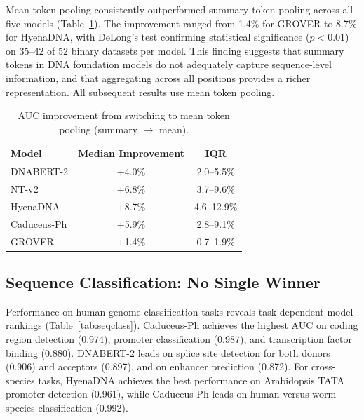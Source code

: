 \documentclass[11pt]{article}
\begin{document}
Mean token pooling consistently outperformed summary token pooling across all five models (Table~\ref{tab:pooling}). The improvement ranged from 1.4\% for GROVER to 8.7\% for HyenaDNA, with DeLong's test confirming statistical significance ($p < 0.01$) on 35--42 of 52 binary datasets per model. This finding suggests that summary tokens in DNA foundation models do not adequately capture sequence-level information, and that aggregating across all positions provides a richer representation. All subsequent results use mean token pooling.

\begin{table}[h]
\centering
\caption{AUC improvement from switching to mean token pooling (summary $\rightarrow$ mean).}
\label{tab:pooling}
\begin{tabular}{lcc}
\toprule
Model & Median Improvement & IQR \\
\midrule
DNABERT-2 & +4.0\% & 2.0--5.5\% \\
NT-v2 & +6.8\% & 3.7--9.6\% \\
HyenaDNA & +8.7\% & 4.6--12.9\% \\
Caduceus-Ph & +5.9\% & 2.8--9.1\% \\
GROVER & +1.4\% & 0.7--1.9\% \\
\bottomrule
\end{tabular}
\end{table}

\subsection{Sequence Classification: No Single Winner}

Performance on human genome classification tasks reveals task-dependent model rankings (Table~\ref{tab:seqclass}). Caduceus-Ph achieves the highest AUC on coding region detection (0.974), promoter classification (0.987), and transcription factor binding (0.880). DNABERT-2 leads on splice site detection for both donors (0.906) and acceptors (0.897), and on enhancer prediction (0.872). For cross-species tasks, HyenaDNA achieves the best performance on Arabidopsis TATA promoter detection (0.961), while Caduceus-Ph leads on human-versus-worm species classification (0.992).
\end{document}
